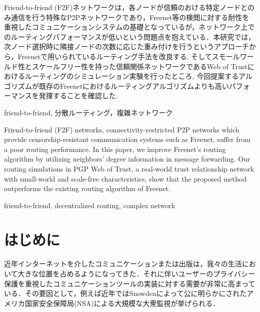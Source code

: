 \documentclass[technicalreport]{./ieicej-v3.0/UTF/ieicej}
\begin{document}
\begin{jabstract}
Friend-to-friend (F2F)ネットワークは，各ノードが信頼のおける特定ノードとのみ通信を行う特殊なP2Pネットワークであり，Freenet等の検閲に対する耐性を重視したコミュニケーションシステムの基礎となっているが，ネットワーク上でのルーティングパフォーマンスが低いという問題点を抱えている．本研究では，次ノード選択時に隣接ノードの次数に応じた重み付けを行うというアプローチから，Freenetで用いられているルーティング手法を改良する. そしてスモールワールド性とスケールフリー性を持った信頼関係ネットワークであるWeb of Trustにおけるルーティングのシミュレーション実験を行ったところ, 今回提案するアルゴリズムが既存のFreenetにおけるルーティングアルゴリズムよりも高いパフォーマンスを発揮することを確認した. 
\end{jabstract}
\begin{jkeyword}
friend-to-friend, 分散ルーティング，複雑ネットワーク
\end{jkeyword}
\begin{eabstract}
Friend-to-friend (F2F) networks, connectivity-restricted P2P networks which provide censorship-resistant communication systems such as Freenet, suffer from a poor routing performance. In this paper, we improve Freenet's routing algorithm by utilizing neighbors' degree information in message forwarding. Our routing simulations in PGP Web of Trust, a real-world trust relationship network with small-world and scale-free characteristics, show that the proposed method outperforms the existing routing algorithm of Freenet.
\end{eabstract}
\begin{ekeyword}
friend-to-friend, decentralized routing, complex network
\end{ekeyword}
\maketitle

\section{はじめに}
近年インターネットを介したコミュニケーションまたは出版は，我々の生活において大きな位置を占めるようになってきた．それに伴いユーザーのプライバシー保護を重視したコミュニケーションツールの実装に対する需要が非常に高まっている．その要因として，例えば近年ではSnowdenによって公に明らかにされたアメリカ国家安全保障局(NSA)による大規模な大衆監視が挙げられる\cite{snowden}．
\end{document}

